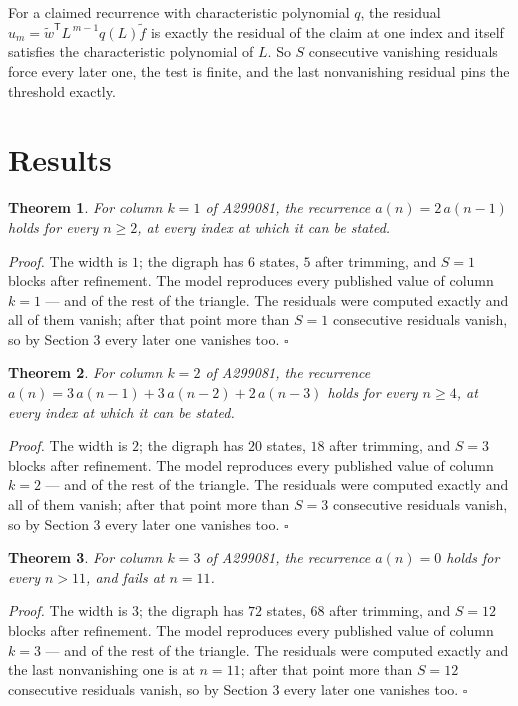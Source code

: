 \documentclass[11pt]{article}
\newtheorem{theorem}{Theorem}
\theoremstyle{definition}
\begin{document}
For a claimed recurrence with characteristic polynomial $q$, the residual $u_m = \tilde w^{\mathsf T}L^{\,m-1}q(L)\tilde f$ is exactly the residual of the claim at one index and itself satisfies the characteristic polynomial of $L$. So $S$ consecutive vanishing residuals force every later one, the test is finite, and the last nonvanishing residual pins the threshold exactly.

\section{Results}

\begin{theorem} For column $k = 1$ of A299081, the recurrence $a(n) = 2\,a(n-1)$ holds for every $n \ge 2$, at every index at which it can be stated.\end{theorem}

{\itshape Proof.} The width is $1$; the digraph has $6$ states, $5$ after trimming, and $S = 1$ blocks after refinement. The model reproduces every published value of column $k = 1$ --- and of the rest of the triangle. The residuals were computed exactly and all of them vanish; after that point more than $S = 1$ consecutive residuals vanish, so by Section 3 every later one vanishes too. $\square$

\begin{theorem} For column $k = 2$ of A299081, the recurrence $a(n) = 3\,a(n-1) + 3\,a(n-2) + 2\,a(n-3)$ holds for every $n \ge 4$, at every index at which it can be stated.\end{theorem}

{\itshape Proof.} The width is $2$; the digraph has $20$ states, $18$ after trimming, and $S = 3$ blocks after refinement. The model reproduces every published value of column $k = 2$ --- and of the rest of the triangle. The residuals were computed exactly and all of them vanish; after that point more than $S = 3$ consecutive residuals vanish, so by Section 3 every later one vanishes too. $\square$

\begin{theorem} For column $k = 3$ of A299081, the recurrence $a(n) = 0$ holds for every $n > 11$, and fails at $n = 11$.\end{theorem}

{\itshape Proof.} The width is $3$; the digraph has $72$ states, $68$ after trimming, and $S = 12$ blocks after refinement. The model reproduces every published value of column $k = 3$ --- and of the rest of the triangle. The residuals were computed exactly and the last nonvanishing one is at $n = 11$; after that point more than $S = 12$ consecutive residuals vanish, so by Section 3 every later one vanishes too. $\square$
\end{document}
